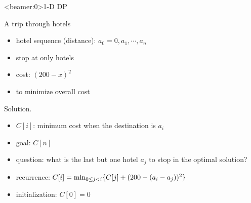 \begin{frame}<beamer:0>{1-D DP}
  \begin{exampleblock}{A trip through hotels }
    \begin{itemize}
      \item hotel sequence (distance): $a_{0} = 0, a_{1}, \cdots, a_{n}$
      \item stop at only hotels
      \item cost: $(200 - x)^{2}$ 
      \item to minimize overall cost
    \end{itemize}
  \end{exampleblock}

  \begin{block}{Solution.}
    \begin{itemize}
      \item $C[i]$: minimum cost when the destination is $a_{i}$
      \item goal: $C[n]$
      \item question: what is the last but one hotel $a_{j}$ to stop in the optimal solution?
      \item recurrence: $C[i] = \min_{0 \le j < i} \{C[j] + (200 - (a_{i} - a_{j}))^{2}\}$
      \item initialization: $C[0] = 0$
    \end{itemize}
  \end{block}
\end{frame}
